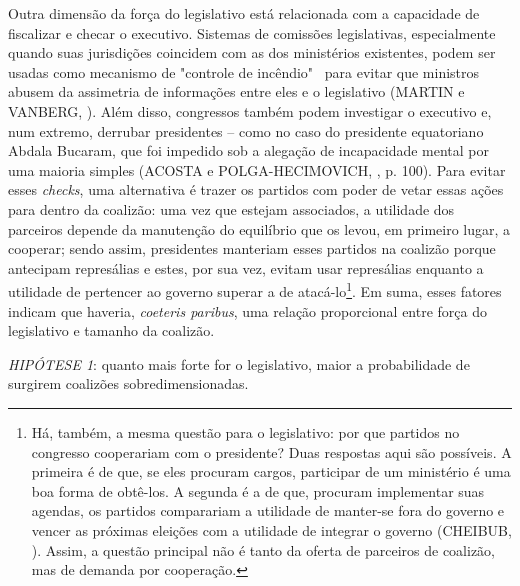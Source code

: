 Outra dimensão da força do legislativo está relacionada com a capacidade de fiscalizar e checar o executivo. Sistemas de comissões legislativas, especialmente quando suas jurisdições coincidem com as dos ministérios existentes, podem ser usadas como mecanismo de "controle de incêndio"~ para evitar que ministros abusem da assimetria de informações entre eles e o legislativo (MARTIN e VANBERG, \citeyear{martin2011}). Além disso, congressos também podem investigar o executivo e, num extremo, derrubar presidentes -- como no caso do presidente equatoriano Abdala Bucaram, que foi impedido sob a alegação de incapacidade mental por uma maioria simples (ACOSTA e POLGA-HECIMOVICH, \citeyear{acosta2011}, p. 100). Para evitar esses \textit{checks}, uma alternativa é trazer os partidos com poder de vetar essas ações para dentro da coalizão: uma vez que estejam associados, a utilidade dos parceiros depende da manutenção do equilíbrio que os levou, em primeiro lugar, a cooperar; sendo assim, presidentes manteriam esses partidos na coalizão porque antecipam represálias e estes, por sua vez, evitam usar represálias enquanto a utilidade de pertencer ao governo superar a de atacá-lo\footnote{Há, também, a mesma questão para o legislativo: por que partidos no congresso cooperariam com o presidente? Duas respostas aqui são possíveis. A primeira é de que, se eles procuram cargos, participar de um ministério é uma boa forma de obtê-los. A segunda é a de que, procuram implementar suas agendas, os partidos comparariam a utilidade de manter-se fora do governo e vencer as próximas eleições com a utilidade de integrar o governo (CHEIBUB, \citeyear{cheibub2007}). Assim, a questão principal não é tanto da oferta de parceiros de coalizão, mas de demanda por cooperação.}. Em suma, esses fatores indicam que haveria, \textit{coeteris paribus}, uma relação proporcional entre força do legislativo e tamanho da coalizão.

\vspace*{1\baselineskip}\vspace*{-\parskip}
\noindent
\textit{HIPÓTESE 1}: quanto mais forte for o legislativo, maior a probabilidade de surgirem coalizões sobredimensionadas.
\vspace*{1\baselineskip}

